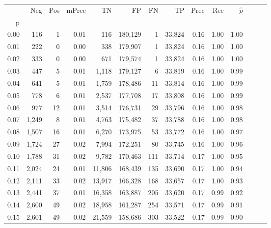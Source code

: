 \begin{tabular}{rrrrrrrrrrrrrr}
\toprule
{} &    Neg &  Pos & mPrec &       TN &       FP &      FN &      TP &  Prec &   Rec & $\hat{p}$ \\
p    &        &      &       &          &          &         &         &       &       &           \\
\midrule
0.00 &    116 &    1 &  0.01 &      116 &  180,129 &       1 &  33,824 &  0.16 &  1.00 &      1.00 \\
0.01 &    222 &    0 &  0.00 &      338 &  179,907 &       1 &  33,824 &  0.16 &  1.00 &      1.00 \\
0.02 &    333 &    0 &  0.00 &      671 &  179,574 &       1 &  33,824 &  0.16 &  1.00 &      1.00 \\
0.03 &    447 &    5 &  0.01 &    1,118 &  179,127 &       6 &  33,819 &  0.16 &  1.00 &      0.99 \\
0.04 &    641 &    5 &  0.01 &    1,759 &  178,486 &      11 &  33,814 &  0.16 &  1.00 &      0.99 \\
0.05 &    778 &    6 &  0.01 &    2,537 &  177,708 &      17 &  33,808 &  0.16 &  1.00 &      0.99 \\
0.06 &    977 &   12 &  0.01 &    3,514 &  176,731 &      29 &  33,796 &  0.16 &  1.00 &      0.98 \\
0.07 &  1,249 &    8 &  0.01 &    4,763 &  175,482 &      37 &  33,788 &  0.16 &  1.00 &      0.98 \\
0.08 &  1,507 &   16 &  0.01 &    6,270 &  173,975 &      53 &  33,772 &  0.16 &  1.00 &      0.97 \\
0.09 &  1,724 &   27 &  0.02 &    7,994 &  172,251 &      80 &  33,745 &  0.16 &  1.00 &      0.96 \\
0.10 &  1,788 &   31 &  0.02 &    9,782 &  170,463 &     111 &  33,714 &  0.17 &  1.00 &      0.95 \\
0.11 &  2,024 &   24 &  0.01 &   11,806 &  168,439 &     135 &  33,690 &  0.17 &  1.00 &      0.94 \\
0.12 &  2,111 &   33 &  0.02 &   13,917 &  166,328 &     168 &  33,657 &  0.17 &  1.00 &      0.93 \\
0.13 &  2,441 &   37 &  0.01 &   16,358 &  163,887 &     205 &  33,620 &  0.17 &  0.99 &      0.92 \\
0.14 &  2,600 &   49 &  0.02 &   18,958 &  161,287 &     254 &  33,571 &  0.17 &  0.99 &      0.91 \\
0.15 &  2,601 &   49 &  0.02 &   21,559 &  158,686 &     303 &  33,522 &  0.17 &  0.99 &      0.90 \\

\end{tabular}
